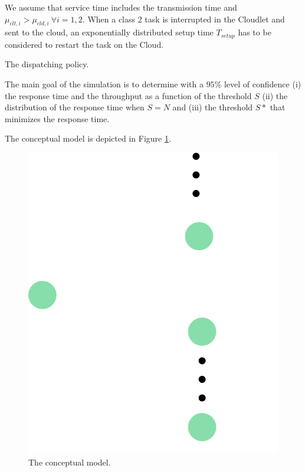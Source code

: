 We assume that service time includes the transmission time and $\mu_{clt,i}>\mu_{cld,i}\ \forall i=1,2$.
When a class 2 task is interrupted in the Cloudlet and sent to the cloud, an exponentially distributed setup time $T_{setup}$ has to be considered to restart the task on the Cloud.

\begin{algorithm}
	\label{alg:modeling-dispatching-policy}
	\SetAlgoLined
	\caption{The dispatching policy.}
\end{algorithm}


The main goal of the simulation is to determine with a $95\%$ level of confidence
(i) the response time and the throughput as a function of the threshold $S$
(ii) the distribution of the response time when $S=N$ and
(iii) the threshold $S*$ that minimizes the response time.


The conceptual model is depicted in Figure \ref{fig:modeling-conceptual-model}.

\begin{figure}
  \label{fig:modeling-conceptual-model}
  \includegraphics[width=\columnwidth]{fig/modeling-conceptual-model}
  \caption{The conceptual model.}
\end{figure}

